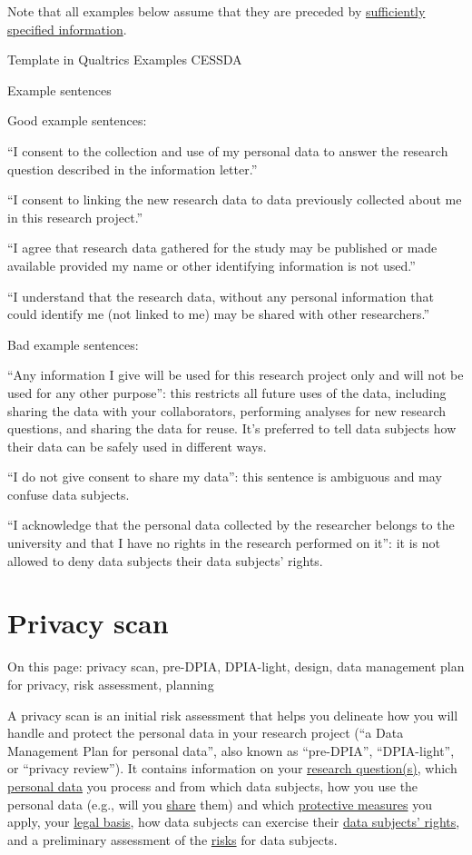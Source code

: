 \documentclass[
]{book}
\begin{document}
Note that all examples below assume that they are preceded by
\protect\hyperlink{privacy-notices}{sufficiently specified information}.

Template in Qualtrics
Examples CESSDA

Example sentences

Good example sentences:

``I consent to the collection and use of my personal data to answer the
research question described in the information letter.''

``I consent to linking the new research data to data previously collected
about me in this research project.''

``I agree that research data gathered for the study may be published or
made available provided my name or other identifying information is not used.''

``I understand that the research data, without any personal information
that could identify me (not linked to me) may be shared with other researchers.''

Bad example sentences:

``Any information I give will be used for this research project only and
will not be used for any other purpose'': this restricts all future uses of
the data, including sharing the data with your collaborators, performing
analyses for new research questions, and sharing the data for reuse. It's
preferred to tell data subjects how their data can be safely used in
different ways.

``I do not give consent to share my data'': this sentence is ambiguous and
may confuse data subjects.

``I acknowledge that the personal data collected by the researcher belongs
to the university and that I have no rights in the research performed on it'':
it is not allowed to deny data subjects their data subjects' rights.

\hypertarget{privacy-scan}{%
\section{Privacy scan}\label{privacy-scan}}

On this page: privacy scan, pre-DPIA, DPIA-light, design, data management plan
for privacy, risk assessment, planning

A privacy scan is an initial risk assessment that helps you delineate how you
will handle and protect the personal data in your research project (``a Data
Management Plan for personal data'', also known as ``pre-DPIA'', ``DPIA-light'', or
``privacy review''). It contains information on your
\protect\hyperlink{purpose-limitation}{research question(s)}, which \protect\hyperlink{personal-data}{personal data}
you process and from which data subjects, how you use the personal data (e.g.,
will you \protect\hyperlink{data-sharing-collaboration}{share} them) and which
\protect\hyperlink{design-strategies}{protective measures} you apply, your \protect\hyperlink{legal-basis}{legal basis},
how data subjects can exercise their \protect\hyperlink{data-subject-rights}{data subjects' rights},
and a preliminary assessment of the \protect\hyperlink{risk-assessment}{risks} for data subjects.
\end{document}
